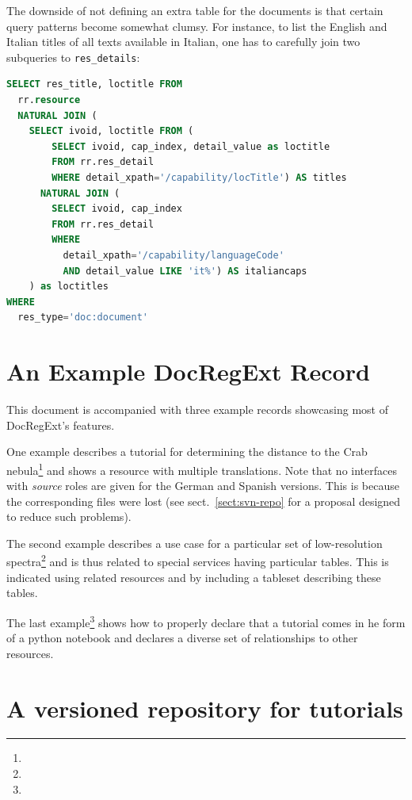 \documentclass{ivoa}
\begin{document}
The downside of not defining an extra table for the documents is that
certain query patterns become somewhat clumsy.  For instance, to list
the English and Italian titles of all texts available in Italian, one
has to carefully join two subqueries to \verb|res_details|:

\begin{lstlisting}[language=SQL]
SELECT res_title, loctitle FROM
  rr.resource
  NATURAL JOIN (
    SELECT ivoid, loctitle FROM (
        SELECT ivoid, cap_index, detail_value as loctitle
        FROM rr.res_detail
        WHERE detail_xpath='/capability/locTitle') AS titles
      NATURAL JOIN (
        SELECT ivoid, cap_index
        FROM rr.res_detail
        WHERE
          detail_xpath='/capability/languageCode'
          AND detail_value LIKE 'it%') AS italiancaps
    ) as loctitles
WHERE
  res_type='doc:document'
\end{lstlisting}


\appendix

\section{An Example DocRegExt Record}

This document is accompanied with three example records showcasing most of
DocRegExt's features.

One example describes a tutorial for determining the distance to the Crab
nebula\footnote{} and shows
a resource with multiple translations.
Note that no interfaces with \textit{source} roles
are given for the German and Spanish versions.  This is because the
corresponding files were lost (see sect.~\ref{sect:svn-repo} for a
proposal designed to reduce such problems).

The second example describes a use case for a particular set of
low-resolution spectra\footnote{} and is
thus related to special services having particular tables.  This is
indicated using related resources and by including a tableset describing
these tables.

The last example\footnote{} shows how
to properly declare that a tutorial comes in he form of a python
notebook and declares a diverse set of relationships to other resources.

\section{A versioned repository for tutorials}
\end{document}
